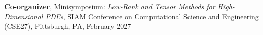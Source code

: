 \textbf{Co-organizer}, Minisymposium: \textit{Low-Rank and Tensor Methods for High-Dimensional PDEs}, SIAM Conference on Computational Science and Engineering (CSE27), Pittsburgh, PA, February 2027
